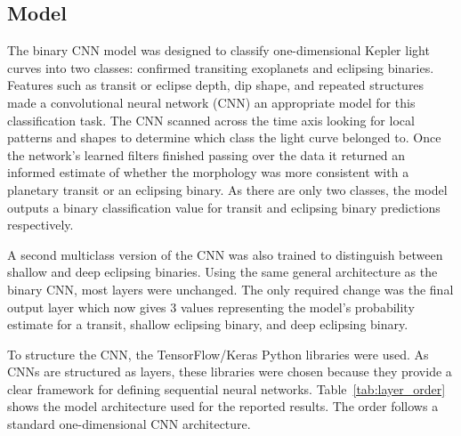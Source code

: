 \subsection{Model}

The binary CNN model was designed to classify one-dimensional Kepler light curves into two classes: confirmed transiting exoplanets and eclipsing binaries. Features such as transit or eclipse depth, dip shape, and repeated structures made a convolutional neural network (CNN) an appropriate model for this classification task. The CNN scanned across the time axis looking for local patterns and shapes to determine which class the light curve belonged to. Once the network's learned filters finished passing over the data it returned an informed estimate of whether the morphology was more consistent with a planetary transit or an eclipsing binary. As there are only two classes, the model outputs a binary classification value for transit and eclipsing binary predictions respectively.

A second multiclass version of the CNN was also trained to distinguish between shallow and deep eclipsing binaries. Using the same general architecture as the binary CNN, most layers were unchanged. The only required change was the final output layer which now gives 3 values representing the model's probability estimate for a transit, shallow eclipsing binary, and deep eclipsing binary. 

To structure the CNN, the TensorFlow/Keras Python libraries were used. As CNNs are structured as layers, these libraries were chosen because they provide a clear framework for defining sequential neural networks. Table~\ref{tab:layer_order} shows the model architecture used for the reported results. The order follows a standard one-dimensional CNN architecture. 

